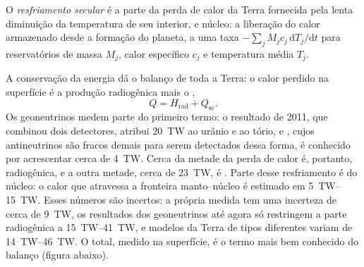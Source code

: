 \begin{definition}\label{def:b1:heat-budget:secular-cooling}
O \emph{resfriamento secular} é a parte da perda de calor da Terra fornecida pela lenta diminuição da temperatura de seu interior,  e núcleo: a liberação do calor armazenado desde a formação do planeta, a uma taxa $-\sum_j M_j c_j\,\mathrm dT_j/\mathrm dt$ para reservatórios de massa $M_j$, calor específico $c_j$ e temperatura média $T_j$.
\end{definition}

A conservação da energia dá o balanço de toda a Terra: o calor perdido na
superfície é a produção radiogênica mais o ,
\[
  Q = H_{\text{rad}} + Q_{\text{sc}} .
\]
Os geoneutrinos medem parte do primeiro termo: o resultado de 2011, que
combinou dois detectores, atribui \qty{20}{TW} ao urânio e ao tório, e
, cujos antineutrinos são fracos demais para serem detectados dessa forma, é
conhecido por acrescentar cerca de \qty{4}{TW}.
Cerca da metade da perda de calor é, portanto, radiogênica, e a outra metade, cerca de \qty{23}{TW}, é . Parte desse resfriamento é do núcleo: o calor que atravessa a fronteira manto--núcleo é estimado em \qtyrange{5}{15}{TW}. Esses números são incertos: a própria medida tem uma incerteza de cerca de \qty{9}{TW}, os resultados dos geoneutrinos até agora só restringem a parte radiogênica a \qtyrange{15}{41}{TW}, e modelos da Terra de tipos diferentes variam de \qtyrange{14}{46}{TW}. O total, medido na superfície, é o termo mais bem conhecido do balanço (figura abaixo).

